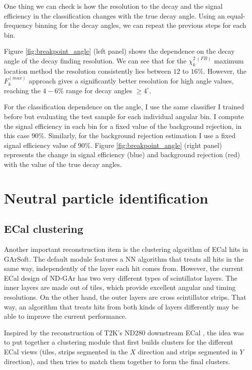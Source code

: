 One thing we can check is how the resolution to the decay and the signal efficiency in the classification changes with the true decay angle. Using an equal-frequency binning for the decay angles, we can repeat the previous steps for each bin.

Figure \ref{fig:breakpoint_angle} (left panel) shows the dependence on the decay angle of the decay finding resolution. We can see that for the $\chi_{k}^{2 \ (FB)}$ maximum location method the resolution consistently lies between $12$ to $16\%$. However, the $F^{(max)}_{k}$ approach gives a significantly better resolution for high angle values, reaching the $4-6\%$ range for decay angles $\geq 4^{\circ}$.

For the classification dependence on the angle, I use the same classifier I trained before but evaluating the test sample for each individual angular bin. I compute the signal efficiency in each bin for a fixed value of the background rejection, in this case $90\%$. Similarly, for the background rejection estimation I use a fixed signal efficiency value of $90\%$. Figure \ref{fig:breakpoint_angle} (right panel) represents the change in signal efficiency (blue) and background rejection (red) with the value of the true decay angles.

\section{Neutral particle identification}\label{section:neutral}

\subsection{ECal clustering}

Another important reconstruction item is the clustering algorithm of ECal hits in GArSoft. The default module features a NN algorithm that treats all hits in the same way, independently of the layer each hit comes from. However, the current ECal design of ND-GAr has two very different types of scintillator layers. The inner layers are made out of tiles, which provide excellent angular and timing resolutions. On the other hand, the outer layers are cross scintillator strips. That way, an algorithm that treats hits from both kinds of layers differently may be able to improve the current performance.

Inspired by the reconstruction of T2K's ND280 downstream ECal \cite{T2KUK2013}, the idea was to put together a clustering module that first builds clusters for the different ECal views (tiles, strips segmented in the $X$ direction and strips segmented in $Y$ direction), and then tries to match them together to form the final clusters.

